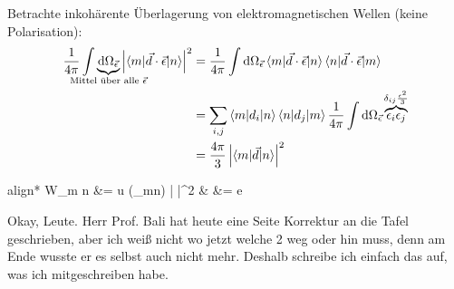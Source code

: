 	Betrachte inkohärente Überlagerung von elektromagnetischen Wellen (keine Polarisation):
		\begin{align*}
			\frac{1}{4 \pi} \int 
			\underbrace{\diff \Omega_{\vec{\epsilon}}}_{\mathclap{\text{Mittel über alle~} \vec{\epsilon}}} 
			\left|\braket{m | \vec{d} \cdot \vec{\epsilon} | n}\right|^2 
			&= \frac{1}{4 \pi} \int \diff \Omega_{\vec{\epsilon}} 
			\braket{m | \vec{d} \cdot \vec{\epsilon} | n} \braket{n | \vec{d} \cdot \vec{\epsilon} | m} \\
			&= \sum_{i,j} \braket{m | d_i | n} \braket{n | d_j | m} 
			\frac{1}{4 \pi} \int \diff \Omega_{\vec{\epsilon}} 
			\overbrace{\epsilon_i \epsilon_j}^{\mathclap{\delta_{ij}\frac{\epsilon^2}{3}}} \\
			&= \frac{4 \pi}{3} \left|\braket{m | \vec{d} | n}\right|^2
		\end{align*} 
		\begin{empheq}[box=\boxed]{align*}
			W_{m \leftarrow n} &= 
			 u (\omega_{mn}) 
			\left| \right|^2 
			&  &= e  
		\end{empheq}
		 Okay, Leute. Herr Prof. Bali hat heute eine Seite Korrektur an die Tafel geschrieben, aber ich weiß nicht wo jetzt welche 2 weg oder hin muss, denn am Ende wusste er es selbst auch nicht mehr. Deshalb schreibe ich einfach das auf, was ich mitgeschreiben habe. 
		
